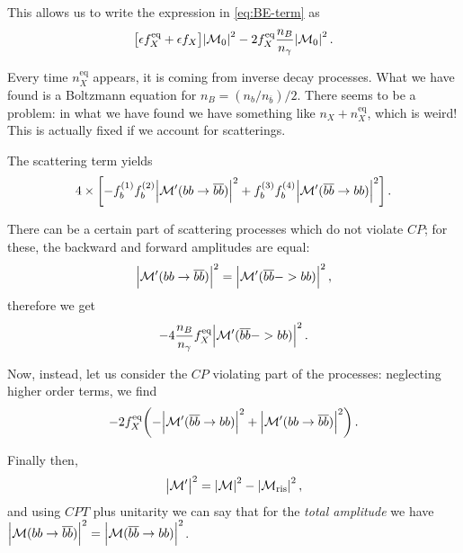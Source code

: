 \documentclass[main.tex]{subfiles}
\begin{document}
This allows us to write the expression in \eqref{eq:BE-term} as 
%
\begin{align}
\qty[\epsilon f_X^{\text{eq}} + \epsilon f_X ] \abs{\mathcal{M}_0}^2
- 2 f_X^{\text{eq}} \frac{n_B}{n_\gamma } \abs{\mathcal{M}_0}^2
\,.
\end{align}

Every time \(n_X^{\text{eq}}\) appears, it is coming from inverse decay processes. 
What we have found is a Boltzmann equation for \(n_B = (n_b / n_{\overline{b}}) / 2\). 
There seems to be a problem: in what we have found we have something like \(n_X + n_X^{\text{eq}}\), which is weird! 
This is actually fixed if we account for scatterings. 

The scattering term yields 
%
\begin{align}
4 \times \qty[
     - f_b^{(1)} f_b^{(2)} \abs{\mathcal{M}' (bb \to \overline{b} \overline{b})}^2 + 
     f_b^{(3)} f_b^{(4)} \abs{\mathcal{M}' (\overline{b} \overline{b} \to bb)}^2  
     ]
\,.
\end{align}

There can be a certain part of scattering processes which do not violate \(CP\); for these, the backward and forward amplitudes are equal: 
%
\begin{align}
\abs{\mathcal{M}' (bb \to \overline{b} \overline{b})}^2
=
\abs{\mathcal{M}' (\overline{b} \overline{b} -> bb)}^2
\,,
\end{align}
%
therefore we get 
%
\begin{align}
- 4 \frac{n_B}{n_\gamma } f_X^{\text{eq}} \abs{\mathcal{M}' (\overline{b} \overline{b} -> bb)}^2
\,.
\end{align}

Now, instead, let us consider the \(CP\) violating part of the processes: neglecting higher order terms, we find 
%
\begin{align}
- 2 f_X^{\text{eq}} \qty(- \abs{\mathcal{M}'(\overline{b} \overline{b} \to bb)}^2 + \abs{\mathcal{M}' (bb \to \overline{b} \overline{b})}^2)
\,.
\end{align}

Finally then, 
%
\begin{align}
\abs{\mathcal{M}'}^2 = \abs{\mathcal{M}}^2 - \abs{\mathcal{M}_{\text{ris}}}^2
\,,
\end{align}
%
and using \(CPT\) plus unitarity we can say that for the \emph{total amplitude} we have \(\abs{\mathcal{M}(bb \to \overline{b}\overline{b})}^2 = \abs{\mathcal{M}(\overline{b}\overline{b} \to bb)}^2\).
\end{document}
